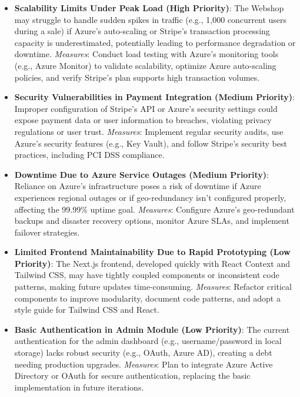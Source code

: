 \begin{itemize}
  \item \textbf{Scalability Limits Under Peak Load (High Priority)}: The Webshop may struggle to handle sudden spikes in traffic (e.g., 1,000 concurrent users during a sale) if Azure’s auto-scaling or Stripe’s transaction processing capacity is underestimated, potentially leading to performance degradation or downtime.  
    \textit{Measures}: Conduct load testing with Azure’s monitoring tools (e.g., Azure Monitor) to validate scalability, optimize Azure auto-scaling policies, and verify Stripe’s plan supports high transaction volumes.

  \item \textbf{Security Vulnerabilities in Payment Integration (Medium Priority)}: Improper configuration of Stripe’s API or Azure’s security settings could expose payment data or user information to breaches, violating privacy regulations or user trust.  
    \textit{Measures}: Implement regular security audits, use Azure’s security features (e.g., Key Vault), and follow Stripe’s security best practices, including PCI DSS compliance.

  \item \textbf{Downtime Due to Azure Service Outages (Medium Priority)}: Reliance on Azure’s infrastructure poses a risk of downtime if Azure experiences regional outages or if geo-redundancy isn’t configured properly, affecting the 99.99\% uptime goal.  
    \textit{Measures}: Configure Azure’s geo-redundant backups and disaster recovery options, monitor Azure SLAs, and implement failover strategies.

  \item \textbf{Limited Frontend Maintainability Due to Rapid Prototyping (Low Priority)}: The Next.js frontend, developed quickly with React Context and Tailwind CSS, may have tightly coupled components or inconsistent code patterns, making future updates time-consuming.  
    \textit{Measures}: Refactor critical components to improve modularity, document code patterns, and adopt a style guide for Tailwind CSS and React.

  \item \textbf{Basic Authentication in Admin Module (Low Priority)}: The current authentication for the admin dashboard (e.g., username/password in local storage) lacks robust security (e.g., OAuth, Azure AD), creating a debt needing production upgrades.  
    \textit{Measures}: Plan to integrate Azure Active Directory or OAuth for secure authentication, replacing the basic implementation in future iterations.
\end{itemize}